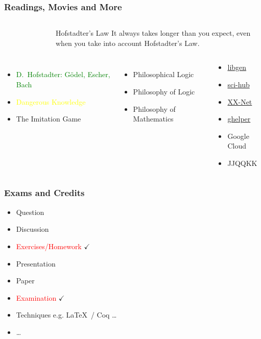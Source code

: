 \documentclass[UTF8,aspectratio=43,11pt,colorlinks,compress,openany]{beamer}%
\begin{document}
\begin{frame}\frametitle{Readings, Movies and More}
	\begin{columns}
		\begin{figure}[H]
		\end{figure}
\begin{block}{Hofstadter's Law}
It always takes longer than you expect, even when you take into account Hofstadter's Law.
\end{block}
	\end{columns}
\begin{columns}
		\column{.56\textwidth}
			\begin{itemize}
				\item \textcolor{green}{D.~Hofstadter: G\"odel, Escher, Bach}
				\item \textcolor{yellow}{Dangerous Knowledge}
				\item The Imitation Game
			\end{itemize}
			\begin{itemize}
				\item Philosophical Logic
				\item Philosophy of Logic
				\item Philosophy of Mathematics
			\end{itemize}
		\begin{block}{}
			\begin{itemize}
				\item \href{https://en.wikipedia.org/wiki/Library_Genesis}{libgen}
				\item \href{https://en.wikipedia.org/wiki/Sci-Hub}{sci-hub}
				\item \href{https://github.com/XX-net/XX-Net}{XX-Net}
				\item \href{http://googlehelper.net/}{ghelper}
				\item Google Cloud
				\item JJQQKK
			\end{itemize}
		\end{block}
\end{columns}
\end{frame}

\begin{frame}\frametitle{Exams and Credits}
	\begin{itemize}
		\item Question
		\item Discussion
		\item \textcolor{red}{Exercises/Homework} $\checkmark$
		\item Presentation
		\item Paper
		\item \textcolor{red}{Examination} $\checkmark$
		\item Techniques e.g. \LaTeX\, / Coq \dots
		\item \dots
	\end{itemize}
\end{frame}
\end{document}
